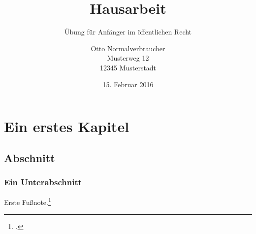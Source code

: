 \documentclass{hausarbeit-jura}
\begin{document}
\frontmatter

\title{Hausarbeit}
\subtitle{Übung für Anfänger im öffentlichen Recht}
\author{Otto Normalverbraucher\\Musterweg 12\\12345 Musterstadt}
\date{15. Februar 2016}
\maketitle

\tableofcontents %



\chapter{Ein erstes Kapitel}\label{chap:ErstesKapitel}

\section{Abschnitt}
\blindtext[4]
\subsection{Ein Unterabschnitt}

Erste Fußnote.\footcite[33]{larenz:methoden}
\end{document}
